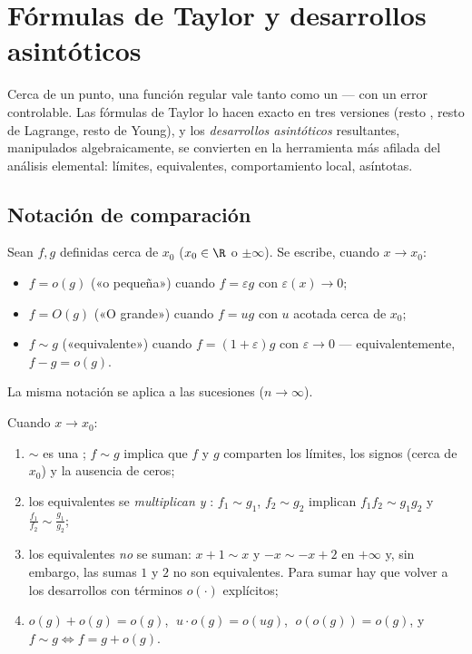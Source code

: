 \chapter{Fórmulas de Taylor y desarrollos asintóticos}\label{ch:b1:taylor}

Cerca de un punto, una función regular vale tanto como un
 --- con un error controlable. Las fórmulas de Taylor lo
hacen exacto en tres versiones (resto , resto de Lagrange,
resto de Young), y los \emph{desarrollos asintóticos} resultantes,
manipulados algebraicamente, se convierten en la herramienta más
afilada del análisis elemental: límites, equivalentes, comportamiento
local, asíntotas.

\section{Notación de comparación}

\begin{definition}\label{def:b1:taylor:landau}
Sean $f, g$ definidas cerca de $x_0$ ($x_0 \in \R$ o $\pm\infty$). Se
escribe, cuando $x \to x_0$:
\begin{itemize}
  \item $f = o(g)$ («o pequeña») cuando $f = \varepsilon g$ con
        $\varepsilon(x) \to 0$;
  \item $f = O(g)$ («O grande») cuando $f = u g$ con $u$ acotada
        cerca de $x_0$;
  \item $f \sim g$ («equivalente»)
        cuando $f = (1 + \varepsilon) g$ con $\varepsilon \to 0$ ---
        equivalentemente, $f - g = o(g)$.
\end{itemize}
La misma notación se aplica a las sucesiones ($n \to \infty$).
\end{definition}

\begin{proposition}[Reglas]\label{prop:b1:taylor:landaurules}
Cuando $x \to x_0$:
\begin{enumerate}
  \item $\sim$ es una ; $f \sim g$ implica
        que $f$ y $g$ comparten los límites, los signos (cerca de
        $x_0$) y la ausencia de ceros;
  \item los equivalentes se \emph{multiplican y }:
        $f_1 \sim g_1$, $f_2 \sim g_2$ implican $f_1 f_2 \sim g_1 g_2$
        y $\frac{f_1}{f_2} \sim \frac{g_1}{g_2}$;
  \item los equivalentes \emph{no} se suman: $x + 1 \sim x$ y
        $-x \sim -x + 2$ en $+\infty$ y, sin embargo, las sumas $1$ y
        $2$ no son equivalentes. Para sumar hay que volver a los
        desarrollos con términos $o(\cdot)$ explícitos;
  \item $o(g) + o(g) = o(g)$, $\;u \cdot o(g) = o(ug)$,
        $\;o(o(g)) = o(g)$, y $f \sim g \iff f = g + o(g)$.
\end{enumerate}
\end{proposition}

